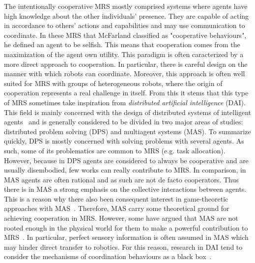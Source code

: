 
    The intentionally cooperative MRS mostly comprised systems where agents have high knowledge about the other individuals' presence. They are capable of acting in accordance to others' actions and capabilities and may use communication to coordinate. In these MRS that McFarland classified as "cooperative behaviours", he defined an agent to be selfish. This means that cooperation comes from the maximization of the agent own utility. This paradigm is often caracterized by a more direct approach to cooperation. In particular, there is careful design on the manner with which robots can coordinate. Moreover, this approach is often well suited for MRS with groups of heterogeneous robots, where the origin of cooperation represents a real challenge in itself. From this it stems that this type of MRS sometimes take inspiration from \emph{distributed artificial intelligence} (DAI). This field is mainly concerned with the design of distributed systems of intelligent agents~\parencite{Cao1997, Panait2005} and is generally considered to be divided in two major areas of studies: distributed problem solving (DPS) and multiagent systems (MAS). To summarize quickly, DPS is mostly concerned with solving problems with several agents. As such, some of its problematics are common to MRS (e.g. task allocation). However, because in DPS agents are considered to always be cooperative and are usually disembodied, few works can really contribute to MRS. In comparison, in MAS agents are often rational and as such are not de facto cooperators. Thus there is in MAS a strong emphasis on the collective interactions between agents. This is a reason why there also been consequent interest in game-theoretic approaches with MAS~\parencite{Rosenschein1985}. Therefore, MAS carry some theoretical ground for achieving cooperation in MRS. However, some have argued that MAS are not rooted enough in the physical world for them to make a powerful contribution to MRS~\parencite{Cao1997, Farinelli2004}. In particular, perfect sensory information is often assumed in MAS which may hinder direct transfer to robotics. For this reason, research in DAI tend to consider the mechanisms of coordination behaviours as a black box~\parencite{Parker1994}.



